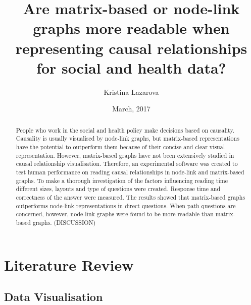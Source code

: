 \documentclass{l4proj}
\begin{document}
\title{Are matrix-based or node-link graphs more readable when representing causal relationships for social and health data?}
\author{Kristina Lazarova}
\date{March, 2017}
\maketitle

\begin{abstract}

People who work in the social and health policy make decisions based on causality. Causality is usually visualised by node-link graphs, but matrix-based representations have the potential to outperform them because of their concise and clear visual representation. However, matrix-based graphs have not been extensively studied in causal relationship visualisation. Therefore, an experimental software was created to test human performance on reading causal relationships in node-link and matrix-based graphs. To make a thorough investigation of the factors influencing reading time different sizes, layouts and type of questions were created. Response time and correctness of the answer were measured. The results showed that matrix-based graphs outperforms node-link representations in direct questions. When path questions are concerned, however, node-link graphs were found to be more readable than matrix-based graphs. (DISCUSSION) 
 
\end{abstract}

\educationalconsent
%
%
\tableofcontents
\chapter{Literature Review}

\section{Data Visualisation}
\end{document}

